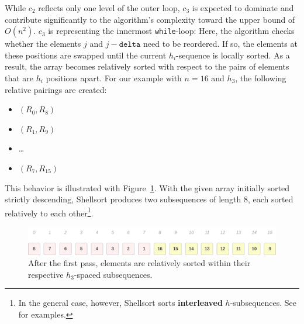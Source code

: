 While $c_2$ reflects only one level of the outer loop, $c_3$ is expected to dominate and contribute significantly to the algorithm's complexity toward the upper bound of $O(n^2)$. $c_3$ is representing the innermost \texttt{while}-loop: Here, the algorithm checks whether the elements $j$ and $j - \texttt{delta}$ need to be reordered.
If so, the elements at these positions are swapped until the current $h_i$-sequence is locally sorted.
As a result, the array becomes relatively sorted with respect to the pairs of elements that are $h_i$ positions apart.
For our example with $n = 16$ and $h_3$, the following relative pairings are created:

\begin{itemize}
    \item $(R_0, R_8)$
    \item $(R_1, R_9)$
    \item \ldots
    \item $(R_7, R_{15})$
\end{itemize}

\noindent
This behavior is illustrated with Figure~\ref{fig:bestcase-it1}.
With the given array initially sorted strictly descending, Shellsort produces two subsequences of length $8$, each sorted relatively to each other\footnote{
In the general case, however, Shellsort sorts \textbf{interleaved} $h$-subsequences. See \cite{Knu97b} for examples.
}.

\begin{figure}[!h]
    \centering
    \includegraphics[width=1\columnwidth]{img/bestcase-it1}
    \caption{After the first pass, elements are relatively sorted within their respective $h_3$-spaced subsequences.}
    \label{fig:bestcase-it1}
\end{figure}
